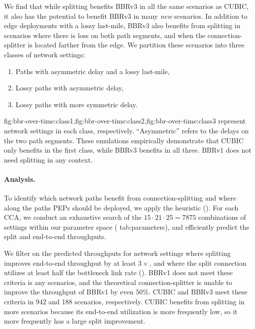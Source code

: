 We find that while splitting benefits BBRv3 in all the same scenarios as CUBIC,
it also has the potential to benefit BBRv3 in many \textit{new} scenarios.
In addition to edge deployments with a lossy last-mile, BBRv3
also benefits from splitting in scenarios where there is loss on both path
segments, and when the connection-splitter is located farther from the edge.
We partition these scenarios into three classes of network settings:

\begin{enumerate}[label=\Roman*.,noitemsep]
\item Paths with asymmetric delay and a lossy last-mile,
\item Lossy paths with asymmetric delay,
\item Lossy paths with more symmetric delay.
\end{enumerate}

\noindent \Cref
 {fig:bbr-over-time:class1,fig:bbr-over-time:class2,fig:bbr-over-time:class3}
represent network settings in each class, respectively.
``Asymmetric'' refers to the delays on the two path segments.
These emulations empirically demonstrate that CUBIC only benefits in the first
class, while BBRv3 benefits in all three.
BBRv1 does not need splitting in any context.

\paragraph{Analysis.}
To identify which network paths benefit from connection-splitting and where
along the paths PEPs should be deployed, we apply the
heuristic ().
For each CCA, we conduct an exhaustive search of the $15 \cdot 21 \cdot 25 =
7875$ combinations of settings within our parameter space (\Cref
{tab:parameters}), and efficiently predict the split and end-to-end throughputs.

We filter on the predicted throughputs for network settings where splitting improves end-to-end throughput by
at least $3\times$, and where the split connection utilizes at least half the
bottleneck link rate (). BBRv1 does not meet
these criteria is any scenarios, and the theoretical connection-splitter is
unable to improve the throughput of BBRv1 by even $50\%$. CUBIC and BBRv3 meet
these criteria in 942 and 188 scenarios, respectively. CUBIC benefits from
splitting in more scenarios because its end-to-end utilization is more
frequently low, so it more frequently has a large split improvement.

